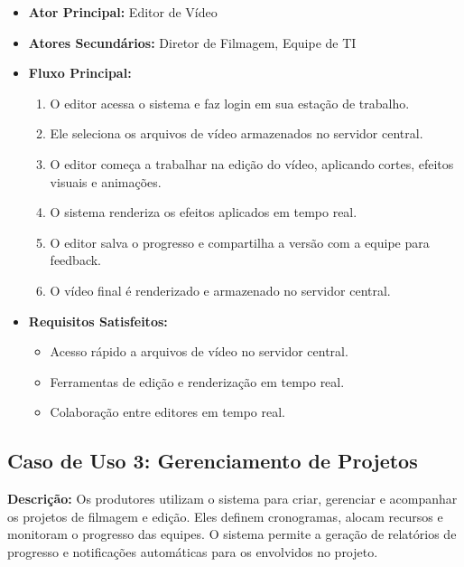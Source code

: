 \begin{itemize}
  \item \textbf{Ator Principal:} Editor de Vídeo
  \item \textbf{Atores Secundários:} Diretor de Filmagem, Equipe de TI
  \item \textbf{Fluxo Principal:}
    \begin{enumerate}
      \item O editor acessa o sistema e faz login em sua estação de trabalho.
      \item Ele seleciona os arquivos de vídeo armazenados no servidor central.
      \item O editor começa a trabalhar na edição do vídeo, aplicando cortes, efeitos visuais e animações.
      \item O sistema renderiza os efeitos aplicados em tempo real.
      \item O editor salva o progresso e compartilha a versão com a equipe para feedback.
      \item O vídeo final é renderizado e armazenado no servidor central.
    \end{enumerate}
  \item \textbf{Requisitos Satisfeitos:}
    \begin{itemize}
      \item Acesso rápido a arquivos de vídeo no servidor central.
      \item Ferramentas de edição e renderização em tempo real.
      \item Colaboração entre editores em tempo real.
    \end{itemize}
\end{itemize}

\subsection{Caso de Uso 3: Gerenciamento de Projetos}

\textbf{Descrição:} Os produtores utilizam o sistema para criar, gerenciar e acompanhar os projetos de filmagem e edição. Eles definem cronogramas, alocam recursos e monitoram o progresso das equipes. O sistema permite a geração de relatórios de progresso e notificações automáticas para os envolvidos no projeto.

